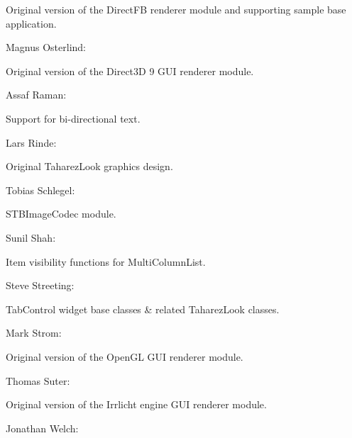 \begin{DoxyItemize}
\begin{DoxyItemize}
\item Original version of the Direct\+FB renderer module and supporting sample base application.
\end{DoxyItemize}
\item Magnus Osterlind\+:
\begin{DoxyItemize}
\item Original version of the Direct3D 9 G\+UI renderer module.
\end{DoxyItemize}
\item Assaf Raman\+:
\begin{DoxyItemize}
\item Support for bi-\/directional text.
\end{DoxyItemize}
\item Lars Rinde\+:
\begin{DoxyItemize}
\item Original Taharez\+Look graphics design.
\end{DoxyItemize}
\item Tobias Schlegel\+:
\begin{DoxyItemize}
\item S\+T\+B\+Image\+Codec module.
\end{DoxyItemize}
\item Sunil Shah\+:
\begin{DoxyItemize}
\item Item visibility functions for Multi\+Column\+List.
\end{DoxyItemize}
\item Steve Streeting\+:
\begin{DoxyItemize}
\item Tab\+Control widget base classes \& related \textquotesingle{}Taharez\+Look\textquotesingle{} classes.
\end{DoxyItemize}
\item Mark Strom\+:
\begin{DoxyItemize}
\item Original version of the Open\+GL G\+UI renderer module.
\end{DoxyItemize}
\item Thomas Suter\+:
\begin{DoxyItemize}
\item Original version of the Irrlicht engine G\+UI renderer module.
\end{DoxyItemize}
\item Jonathan Welch\+:
\begin{DoxyItemize}

\end{DoxyItemize}
\end{DoxyItemize}
